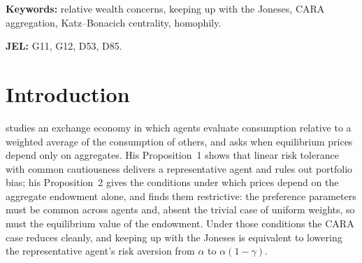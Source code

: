 \begin{abstract}
In a one-period CARA economy with Gaussian payoffs, exogenous quantities and
endogenous prices, each investor compares his wealth to a weighted average over
a network of peers. Equilibrium demand scales solve a Katz--Bonacich system, and
prices are explicit in one scalar, the effective market coefficient, which is
itself independent of prices; the market Sharpe ratio is proportional to it. Two
limits, available for every network, organise how the network aggregates risk
aversion. At zero comparison intensity the marginal effect is a quadratic form
in risk tolerances, and a doubly stochastic influence matrix --- balanced
attention --- makes it a Dirichlet form, hence non-negative for every profile of
tolerances. Under intense comparison the coefficient converges to a stationary
average of individual coefficients, weighted by influence rather than by
population. It then falls below its no-comparison value, taking the Sharpe ratio
with it, whenever stationary influence sufficiently favours the less risk
averse; it interpolates from the harmonic to the arithmetic mean when influence
is spread evenly; and it does not move at all when the network splits into
blocks homogeneous in type. A
separate result is that comparison is exactly neutral, for every network and
every profile of intensities, when net risk aversion is common.
\end{abstract}

\noindent\textbf{Keywords:} relative wealth concerns, keeping up with the
Joneses, CARA aggregation, Katz--Bonacich centrality, homophily.

\medskip
\noindent\textbf{JEL:} G11, G12, D53, D85.

\section{Introduction}

\cite{gomez} studies an exchange economy in which agents evaluate consumption
relative to a weighted average of the consumption of others, and asks when
equilibrium prices depend only on aggregates. His Proposition~1 shows that
linear risk tolerance with common cautiousness delivers a representative agent
and rules out portfolio bias; his Proposition~2 gives the conditions under
which prices depend on the aggregate endowment alone, and finds them
restrictive: the preference parameters must be common across agents and, absent
the trivial case of uniform weights, so must the equilibrium value of the
endowment. Under those conditions the CARA case reduces cleanly, and keeping up
with the Joneses is equivalent to lowering the representative agent's risk
aversion from $\alpha$ to $\alpha(1-\gamma)$.

